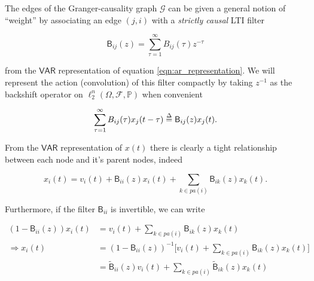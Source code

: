 \documentclass[12pt]{article}
\def\gcg{\mathcal{G}}  %
\def\VAR{\mathsf{VAR}}  %
\def\B{\mathsf{B}}  %
\def\wtB{\widetilde{\B}}  %
\newcommand{\pa}[1]{pa(#1)}  %
\begin{document}
The edges of the Granger-causality graph $\gcg$ can be given a general
notion of ``weight'' by associating an edge $(j, i)$ with a
\textit{strictly causal} LTI filter

\begin{equation}
  \label{eqn:filter}
  \B_{ij}(z) = \sum_{\tau = 1}^{\infty} B_{ij}(\tau)z^{-\tau}
\end{equation}

from the $\VAR$ representation of equation
\ref{eqn:ar_representation}.  We will represent the action
(convolution) of this filter compactly by taking $z^{-1}$ as the
backshift operator on $\ell_2^n(\Omega, \mathcal{F}, \mathbb{P})$ when
convenient

\begin{equation}
  \sum_{\tau = 1}^\infty B_{ij}(\tau)x_j(t - \tau) \defeq \B_{ij}(z)x_j(t).
\end{equation}


From the $\VAR$ representation of $x(t)$ there is clearly a tight
relationship between each node and it's parent nodes, indeed

\begin{equation}
  \label{eqn:parent_expansion}
  x_i(t) = v_i(t) + \B_{ii}(z)x_i(t) + \sum_{k \in \pa{i}}\B_{ik}(z)x_k(t).
\end{equation}

Furthermore, if the filter $\B_{ii}$ is invertible, we can write

\begin{equation*}
  \begin{aligned}
    (1 - \B_{ii}(z))x_i(t) &= v_i(t) + \sum_{k \in \pa{i}}\B_{ik}(z)x_k(t)\\
    \Rightarrow x_i(t) &= (1 - \B_{ii}(z))^{-1}\big[v_i(t) + \sum_{k \in \pa{i}}\B_{ik}(z)x_k(t)\big]\\
    &= \wtB_{ii}(z)v_i(t) + \sum_{k \in \pa{i}}\wtB_{ik}(z)x_k(t)
  \end{aligned}
\end{equation*}

\end{document}
